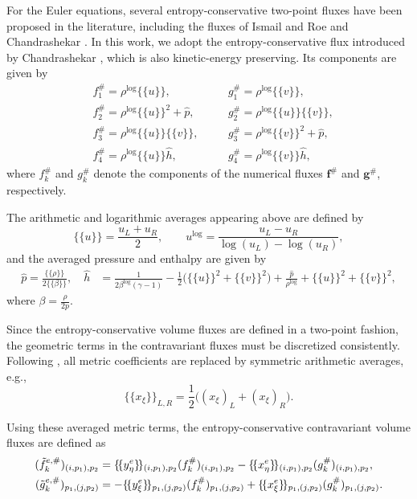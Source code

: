\documentclass[fleqn,11pt]{amsart}
\newcommand{\avg}[1]{\{\!\{#1\}\!\}}
\begin{document}
For the Euler equations, several entropy-conservative two-point fluxes have been proposed in the literature,
including the fluxes of Ismail and Roe \cite{ismail2009affordable} and Chandrashekar
\cite{chandrashekar2013kinetic}. In this work, we adopt the entropy-conservative flux introduced by
Chandrashekar \cite{chandrashekar2013kinetic}, which is also  kinetic-energy preserving. Its components are given by
\begin{equation}
\label{eq_chandrasheka}
\begin{alignedat}{2}
&f_1^\# = \rho^{\log}\avg{u},
&&\quad
g_1^\# = \rho^{\log}\avg{v},\\
&f_2^\# = \rho^{\log}\avg{u}^2+\hat{p},
&&\quad
g_2^\# = \rho^{\log}\avg{u}\avg{v},\\
&f_3^\# = \rho^{\log}\avg{u}\avg{v},
&&\quad
g_3^\# = \rho^{\log}\avg{v}^2+\hat{p},\\
&f_4^\# = \rho^{\log}\avg{u}\hat{h},
&&\quad
g_4^\# = \rho^{\log}\avg{v}\hat{h},
\end{alignedat}
\end{equation}
where $f_k^\#$ and $g_k^\#$ denote the components of the numerical fluxes
$\bm f^\#$ and $\bm g^\#$, respectively.

The arithmetic and logarithmic averages appearing above are defined by
\begin{equation}
\avg{u}=\frac{u_L+u_R}{2},
\qquad
u^{\log}=\frac{u_L-u_R}{\log(u_L)-\log(u_R)},
\end{equation}
and the averaged pressure and enthalpy are given by
\begin{equation}
\begin{aligned}
\hat{p}=\frac{\avg{\rho}}{2\avg{\beta}},\quad \hat{h}
&=
\frac{1}{2\beta^{\log}(\gamma-1)}
-\frac12\big(\avg{u}^2+\avg{v}^2\big)
+\frac{\hat{p}}{\rho^{\log}}
+\avg{u}^2+\avg{v}^2,
\end{aligned}
\end{equation}
where $\beta = \frac{\rho}{2p}.$

Since the entropy-conservative volume fluxes are defined in a two-point fashion, the geometric terms in the
contravariant fluxes must be discretized consistently. Following
\cite{wintermeyer2017entropy}, all metric coefficients are replaced by symmetric arithmetic averages, e.g.,
\begin{equation}
\{\!\{x_{\xi}\}\!\}_{L,R}
=
\frac12\big((x_{\xi})_L+(x_{\xi})_R\big).
\end{equation}

Using these averaged metric terms, the entropy-conservative contravariant volume fluxes are defined as
\begin{align}
\label{ec}
(\Tilde{f}_k^{e,\#})_{(i,p_1),p_2}
&=
\{\!\{y_{\eta}^e\}\!\}_{(i,p_1),p_2}(f_k^\#)_{(i,p_1),p_2}
-
\{\!\{x_{\eta}^e\}\!\}_{(i,p_1),p_2}(g_k^\#)_{(i,p_1),p_2},\\
(\Tilde{g}_k^{e,\#})_{p_1,(j,p_2)}
&=
-
\{\!\{y_{\xi}^e\}\!\}_{p_1,(j,p_2)}(f_k^\#)_{p_1,(j,p_2)}
+
\{\!\{x_{\xi}^e\}\!\}_{p_1,(j,p_2)}(g_k^\#)_{p_1,(j,p_2)}.
\end{align}
\end{document}
